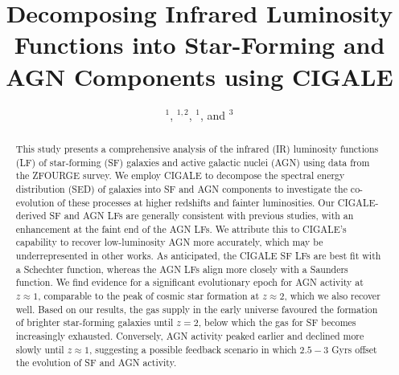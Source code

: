 


\title{Decomposing Infrared Luminosity Functions into Star-Forming and AGN Components using CIGALE}

\author{ $^{1}$,  
         $^{1,2}$,
         $^{1}$,
        and  $^{3}$}





\begin{abstract}
    This study presents a comprehensive analysis of the infrared (IR) luminosity functions (LF) of star-forming (SF) galaxies and active galactic nuclei (AGN) using data from the ZFOURGE survey. We employ CIGALE to decompose the spectral energy distribution (SED) of galaxies into SF and AGN components to investigate the co-evolution of these processes at higher redshifts and fainter luminosities. Our CIGALE-derived SF and AGN LFs are generally consistent with previous studies, with an enhancement at the faint end of the AGN LFs. We attribute this to CIGALE's capability to recover low-luminosity AGN more accurately, which may be underrepresented in other works. As anticipated, the CIGALE SF LFs are best fit with a Schechter function, whereas the AGN LFs align more closely with a Saunders function. We find evidence for a significant evolutionary epoch for AGN activity at $z \approx 1$, comparable to the peak of cosmic star formation at $z \approx 2$, which we also recover well. Based on our results, the gas supply in the early universe favoured the formation of brighter star-forming galaxies until $z=2$, below which the gas for SF becomes increasingly exhausted. Conversely, AGN activity peaked earlier and declined more slowly until $z \approx 1$, suggesting a possible feedback scenario in which $2.5-3$ Gyrs offset the evolution of SF and AGN activity. 
\end{abstract}

